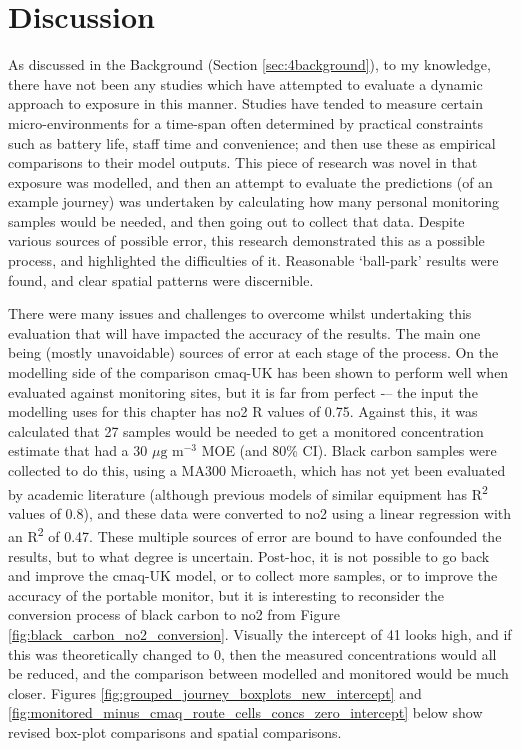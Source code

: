 \section{Discussion}
\label{sec:4Discussion}

As discussed in the Background (Section \ref{sec:4background}), to my knowledge, there have not been any studies which have attempted to evaluate a dynamic approach to exposure in this manner. Studies have tended to measure certain micro-environments for a time-span often determined by practical constraints such as battery life, staff time and convenience; and then use these as empirical comparisons to their model outputs.
This piece of research was novel in that exposure was modelled, and then an attempt to evaluate the predictions (of an example journey) was undertaken by calculating how many personal monitoring samples would be needed, and then going out to collect that data. Despite various sources of possible error, this research demonstrated this as a possible process, and highlighted the difficulties of it. Reasonable ‘ball-park’ results were found, and clear spatial patterns were discernible. 

There were many issues and challenges to overcome whilst undertaking this evaluation that will have impacted the accuracy of the results. The main one being (mostly unavoidable) sources of error at each stage of the process. On the modelling side of the comparison \gls{cmaq}-UK has been shown to perform well when evaluated against monitoring sites, but it is far from perfect -– the input the modelling uses for this chapter has \gls{no2} R values of 0.75. Against this, it was calculated that 27 samples would be needed to get a monitored concentration estimate that had a 30 $\mu \text{g m}^{-3}$ MOE (and 80\% CI). Black carbon samples were collected to do this, using a MA300 Microaeth, which has not yet been evaluated by academic literature (although previous models of similar equipment has R\textsuperscript{2} values of 0.8), and these data were converted to \gls{no2} using a linear regression with an R\textsuperscript{2} of 0.47. These multiple sources of error are bound to have confounded the results, but to what degree is uncertain. Post-hoc, it is not possible to go back and improve the \gls{cmaq}-UK model, or to collect more samples, or to improve the accuracy of the portable monitor, but it is interesting to reconsider the conversion process of black carbon to \gls{no2} from Figure \ref{fig:black_carbon_no2_conversion}. Visually the intercept of 41 looks high, and if this was theoretically changed to 0, then the measured concentrations would all be reduced, and the comparison between modelled and monitored would be much closer. Figures \ref{fig:grouped_journey_boxplots_new_intercept} and \ref{fig:monitored_minus_cmaq_route_cells_concs_zero_intercept} below show revised box-plot comparisons and spatial comparisons.

